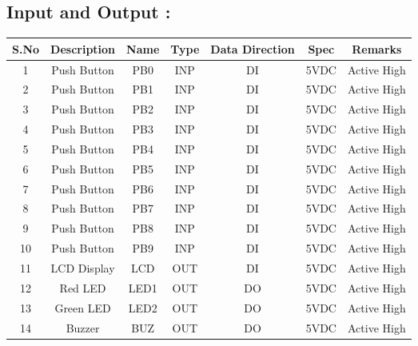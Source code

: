 \documentclass[12pt]{article}
\begin{document}
\pagebreak

 \subsection*{\textbf{Input and Output :}}
 
 \begin{tabular}{|c|c|c|c|c|c|c|}
  \hline
 \textbf{S.No }& \textbf{Description} & \textbf{Name}&\textbf{Type }& \textbf{Data Direction}  &\textbf{ Spec}& \textbf{Remarks} \\
  \hline
  1 &  Push Button & PB0 & INP  & DI  &5VDC&Active High \\
  \hline
  2 & Push Button & PB1 &INP  & DI  &5VDC&Active High \\
  \hline
  3 &  Push Button & PB2 &INP &DI &5VDC&Active High \\
  \hline
  4 &  Push Button & PB3 &INP & DI  & 5VDC&Active High \\
  \hline
  5& Push Button & PB4 &INP &DI &5VDC&Active High\\
 \hline
  6 & Push Button & PB5 &INP &DI &5VDC&Active High \\
  \hline
  7 &  Push Button & PB6 &INP & DI  &5VDC&Active High\\
  \hline
   8 & Push Button & PB7 &INP  & DI &5VDC&Active High \\
  \hline
  9 & Push Button & PB8 &INP & DI &5VDC&Active High \\
  \hline
  10 &Push Button & PB9 &INP &DI &5VDC&Active High \\
  \hline
  11 & LCD Display & LCD &OUT & DI &5VDC&Active High \\
  \hline
  12 &  Red LED & LED1 &OUT & DO &5VDC&Active High \\
 \hline
  13 &  Green LED & LED2 &OUT & DO &5VDC&Active High \\
  \hline
  14 & Buzzer & BUZ &OUT& DO &5VDC&Active High \\
  \hline
\end{tabular}
\end{document}
